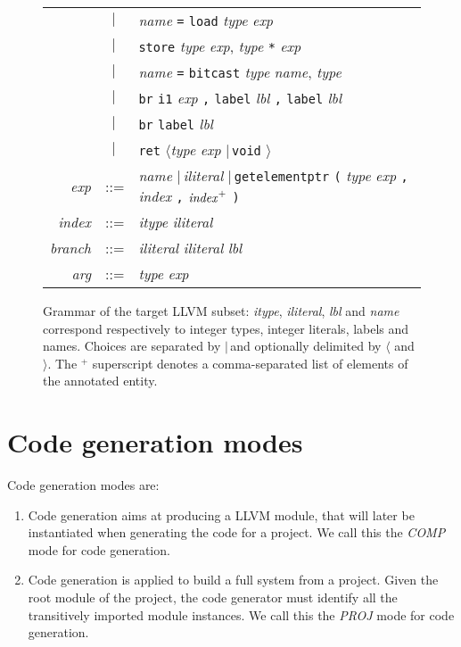 \documentclass{article}
\newcommand{\llvm}[1]{\texttt{#1}}
\newcommand{\lalt}[0]{$\langle$\xspace}
\newcommand{\ralt}[0]{$\rangle$\xspace}
\newcommand{\alt}[0]{$\mid\,$}
\newcommand{\ListOf}[1]{$\mbox{#1}^+$}
\newcommand{\nt}[1]{{\normalfont\textit{#1}}}
\begin{document}
\begin{figure}
\begin{center}
\begin{tabular}{rcl}
      & \alt & \nt{name} \llvm{=} \llvm{load} \nt{type} \nt{exp} \\
      & \alt & \llvm{store} \nt{type} \nt{exp}, \nt{type} \llvm{*} \nt{exp} \\
      & \alt & \nt{name} \llvm{=} \llvm{bitcast} \nt{type} \nt{name}, \nt{type} \\
      & \alt & \llvm{br} \llvm{i1} \nt{exp} \llvm{,} \llvm{label} \nt{lbl} \llvm{,} \llvm{label} \nt{lbl} \\
      & \alt & \llvm{br} \llvm{label} \nt{lbl} \\
      & \alt & \llvm{ret} \lalt \nt{type} \nt{exp} \alt \llvm{void} \ralt \\
      \nt{exp} & ::= & \nt{name} \alt \nt{iliteral} \alt \llvm{getelementptr} \llvm{(} \nt{type} \nt{exp} \llvm{,} \nt{index} \llvm{,} \ListOf{\nt{index}}  \llvm{)} \\
      \nt{index} & ::= & \nt{itype} \nt{iliteral} \\
      \nt{branch} & ::= & \nt{iliteral} \nt{iliteral} \nt{lbl} \\
      \nt{arg} & ::= & \nt{type} \nt{exp}
    \end{tabular}
  \end{center}
  \caption{Grammar of the target LLVM subset: \nt{itype}, \nt{iliteral}, \nt{lbl}
    and \nt{name} correspond respectively to integer types, integer literals,
    labels and names. Choices are separated by \alt and optionally delimited by
    \lalt and \ralt.  The \ListOf{} superscript denotes a comma-separated list of
    elements of the annotated entity.}
  \label{fig:llvm-grammar}
\end{figure}

\section{Code generation modes}
\label{sec:overview}

Code generation modes are:
\begin{enumerate}
\item Code generation aims at producing a LLVM module,
  that will later be instantiated when generating the code for a project. We
  call this the \emph{COMP} mode for code generation.
\item Code generation is applied to build a full system from a project. Given
  the root module of the project, the code generator must identify all the
  transitively imported module instances. We call this the \emph{PROJ} mode for
  code generation.
\end{enumerate}
\end{document}
